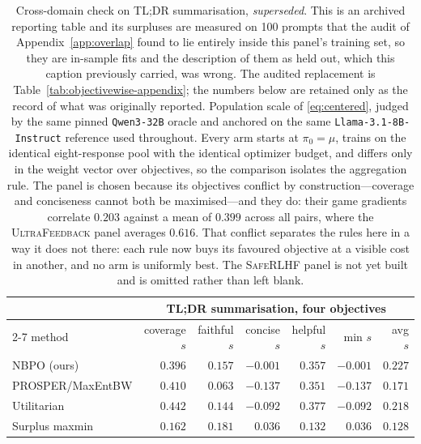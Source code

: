 \documentclass{article}
\theoremstyle{remark}
\theoremstyle{plain}
\newcommand{\NBPO}{\textsc{NBPO}}
\begin{document}
\begin{table}[t]
\centering\footnotesize
\setlength{\tabcolsep}{3.5pt}
\caption{Cross-domain check on \textsc{TL;DR} summarisation, \emph{superseded}. This is an archived
reporting table and its surpluses are measured on 100 prompts that the audit of
Appendix~\ref{app:overlap} found to lie entirely inside this panel's training set, so they are in-sample
fits and the description of them as held out, which this caption previously carried, was wrong. The
audited replacement is Table~\ref{tab:objectivewise-appendix}; the numbers below are retained only as the
record of what was originally reported. Population scale of \eqref{eq:centered}, judged by the same pinned \texttt{Qwen3-32B} oracle and anchored on the same \texttt{Llama-3.1-8B-Instruct} reference used throughout. Every arm starts at $\pi_0=\mu$, trains on the identical eight-response pool with the identical optimizer budget, and differs only in the weight vector over objectives, so the comparison isolates the aggregation rule. The panel is chosen because its objectives conflict by construction---coverage and conciseness cannot both be maximised---and they do: their game gradients correlate $0.203$ against a mean of $0.399$ across all pairs, where the \textsc{UltraFeedback} panel averages $0.616$. That conflict separates the rules here in a way it does not there: each rule now buys its favoured objective at a visible cost in another, and no arm is uniformly best. The \textsc{SafeRLHF} panel is not yet built and is omitted rather than left blank.}
\label{tab:cross-domain-completion}
\begin{tabular}{lrrrrrr}
\toprule
& \multicolumn{6}{c}{\textsc{TL;DR} summarisation, four objectives}\\
\cmidrule(lr){2-7}
method & coverage $s$ & faithful $s$ & concise $s$ & helpful $s$ & min $s$ & avg $s$ \\
\midrule
\NBPO{} (ours) & $0.396$ & $0.157$ & $-0.001$ & $0.357$ & $-0.001$ & $\mathbf{0.227}$ \\
PROSPER/MaxEntBW & $0.410$ & $0.063$ & $-0.137$ & $0.351$ & $-0.137$ & $0.171$ \\
Utilitarian & $\mathbf{0.442}$ & $0.144$ & $-0.092$ & $\mathbf{0.377}$ & $-0.092$ & $0.218$ \\
Surplus maxmin & $0.162$ & $\mathbf{0.181}$ & $\mathbf{0.036}$ & $0.132$ & $\mathbf{0.036}$ & $0.128$ \\
\bottomrule
\end{tabular}
\end{table}
\end{document}
